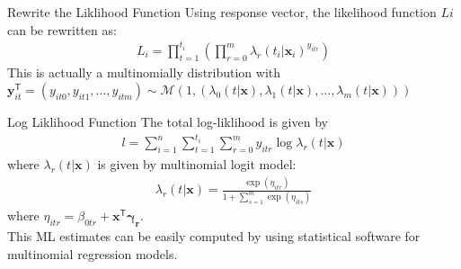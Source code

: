 \documentclass{beamer}
\begin{document}
     \begin{frame}{Rewrite the Liklihood Function}
         Using response vector, the likelihood function $Li$ can be rewritten as:
         \begin{align*}
         L_i = \prod_{t = 1}^{t_i}  (\prod_{r = 0}^{m} \lambda_{r}(t_i|\mathbf{x}_i)^{y_{itr}}) 
         \end{align*}
         This is actually a multinomially distribution with $\mathbf{y}_{it}^\mathsf{T}  = (y_{it0},y_{it1},...,y_{itm}) \sim \mathcal{M}(1, ( \lambda_0(t|\mathbf{x}),\lambda_1(t|\mathbf{x}),\dots,\lambda_m(t|\mathbf{x}) ) )$
     \end{frame}
    
     \begin{frame}{Log Liklihood Function}
         The total log-liklihood is given by
         \begin{align*}
         l = \sum_{i=1}^{n} \sum_{t = 1}^{t_i} \sum_{r=0}^{m}
         y_{itr} \log\lambda_r(t|\mathbf{x})
         \end{align*}
         where $\lambda_r(t|\mathbf{x})$ is given by multinomial logit model:
         \begin{align*}
         \lambda_r(t|\mathbf{x}) = \frac{ \exp{ ( \eta_{itr} ) } }{ 1+ \sum_{s=1}^{m} \exp{ (\eta_{its}) }  }
         \end{align*}
         where $\eta_{itr} = \beta_{0tr}+\mathbf{x}^\mathsf{T} \mathbf{\gamma_r}$.\\
         This ML estimates can be easily computed by using statistical software for multinomial regression models.
     \end{frame}
\end{document}
